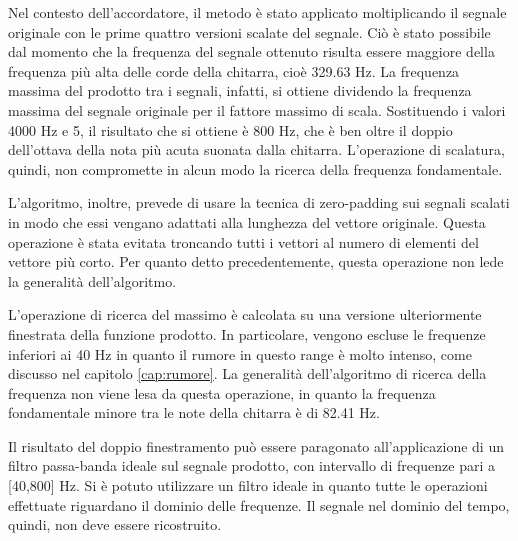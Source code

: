 		

	Nel contesto dell'accordatore, il metodo è stato applicato moltiplicando il segnale originale con le prime quattro versioni scalate del segnale.
	Ciò è stato possibile dal momento che la frequenza del segnale ottenuto risulta essere maggiore della frequenza più alta delle corde della chitarra, cioè 329.63 Hz.
	La frequenza massima del prodotto tra i segnali, infatti, si ottiene dividendo la frequenza massima del segnale originale per il fattore massimo di scala.
	Sostituendo i valori 4000 Hz e 5, il risultato che si ottiene è 800 Hz, che è ben oltre il doppio dell'ottava della nota più acuta suonata dalla chitarra. L'operazione di scalatura, quindi, non compromette in alcun modo la ricerca della frequenza fondamentale.

	L'algoritmo, inoltre, prevede di usare la tecnica di zero-padding sui segnali scalati in modo che essi vengano adattati alla lunghezza del vettore originale. 
	Questa operazione è stata evitata troncando tutti i vettori al numero di elementi del vettore più corto.
	Per quanto detto precedentemente, questa operazione non lede la generalità dell'algoritmo.

	L'operazione di ricerca del massimo è calcolata su una versione ulteriormente finestrata della funzione prodotto. 
	In particolare, vengono escluse le frequenze inferiori ai 40 Hz in quanto il rumore in questo range è molto intenso, come discusso nel capitolo \ref{cap:rumore}.
	La generalità dell'algoritmo di ricerca della frequenza non viene lesa da questa operazione, in quanto la frequenza fondamentale minore tra le note della chitarra è di 82.41 Hz.

	Il risultato del doppio finestramento può essere paragonato all'applicazione di un filtro passa-banda ideale sul segnale prodotto, con intervallo di frequenze pari a [40,800] Hz.
	Si è potuto utilizzare un filtro ideale in quanto tutte le operazioni effettuate riguardano il dominio delle frequenze.
	Il segnale nel dominio del tempo, quindi, non deve essere ricostruito.




